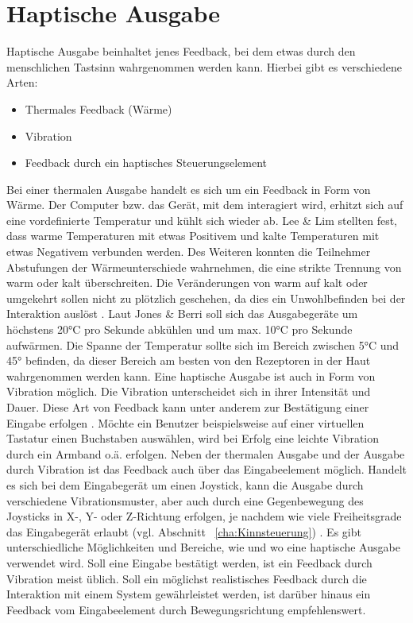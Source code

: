 \section{Haptische Ausgabe}
Haptische Ausgabe beinhaltet jenes Feedback, bei dem etwas durch den menschlichen Tastsinn wahrgenommen werden kann. Hierbei gibt es verschiedene Arten:
%
%
\begin{itemize}
      \item Thermales Feedback (\zB Wärme)
      \item Vibration
			\item Feedback durch ein haptisches Steuerungselement
\end{itemize}
\vspace{\baselineskip}
%
%
Bei einer thermalen Ausgabe handelt es sich um ein Feedback in Form von Wärme. Der Computer bzw. das Gerät, mit dem interagiert wird, erhitzt sich auf eine vordefinierte Temperatur und kühlt sich wieder ab. Lee \& Lim \cite{LeeLim} stellten fest, dass warme Temperaturen mit etwas Positivem und kalte Temperaturen mit etwas Negativem verbunden werden. Des Weiteren konnten die Teilnehmer Abstufungen der Wärmeunterschiede wahrnehmen, die eine strikte Trennung von warm oder kalt überschreiten. Die Veränderungen von warm auf kalt oder umgekehrt sollen nicht zu plötzlich geschehen, da dies ein Unwohlbefinden bei der Interaktion auslöst \cite{LeeLim}. \newline
Laut Jones & Berri \cite{JonesBerris} soll sich das Ausgabegeräte um höchstens 20°C pro Sekunde abkühlen und um max. 10°C pro Sekunde aufwärmen. Die Spanne der Temperatur sollte sich im Bereich zwischen 5°C und 45° befinden, da dieser Bereich am besten von den Rezeptoren in der Haut wahrgenommen werden kann.
\newline \newline
Eine haptische Ausgabe ist auch in Form von Vibration möglich. Die Vibration unterscheidet sich in ihrer Intensität und Dauer. Diese Art von Feedback kann unter anderem zur Bestätigung einer Eingabe erfolgen \cite{Vibration}. Möchte ein Benutzer beispielsweise auf einer virtuellen Tastatur einen Buchstaben auswählen, wird bei Erfolg eine leichte Vibration durch ein Armband o.ä. erfolgen.
\newline \newline
Neben der thermalen Ausgabe und der Ausgabe durch Vibration ist das Feedback auch über das Eingabeelement möglich. Handelt es sich bei dem Eingabegerät um einen Joystick, kann die Ausgabe durch verschiedene Vibrationsmuster, aber auch durch eine Gegenbewegung des Joysticks in X-, Y- oder Z-Richtung erfolgen, je nachdem wie viele Freiheitsgrade das Eingabegerät erlaubt (vgl. Abschnitt ~\ref{cha:Kinnsteuerung}) \cite{an2002haptic}. 
\newline \newline
Es gibt unterschiedliche Möglichkeiten und Bereiche, wie und wo eine haptische Ausgabe verwendet wird. Soll eine Eingabe bestätigt werden, ist ein Feedback durch Vibration meist üblich. Soll ein möglichst realistisches Feedback durch die Interaktion mit einem System gewährleistet werden, ist darüber hinaus ein Feedback vom Eingabeelement durch Bewegungsrichtung empfehlenswert.  
\newpage
